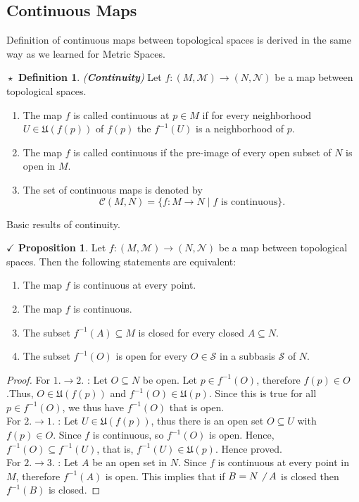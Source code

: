 \documentclass{article}
\theoremstyle{definition}
\newtheorem{definition}{$\boxed{\star}$ Definition}
\newcommand{\tit}[1]{\textit{#1}}
\theoremstyle{remark}
\theoremstyle{definition}
\theoremstyle{definition}
\newtheorem{proposition}{$\checkmark$ Proposition}
\newcommand{\topo}[1]{\mathcal{#1}}
\newcommand{\nbdsys}[2]{\mathfrak{#1}(#2)}
\newcommand{\cntnsmap}[2]{\mathscr{C}(#1,#2)}
\begin{document}
\subsection{Continuous Maps}
Definition of continuous maps between topological spaces is derived in the same way as we learned for Metric Spaces.
\hrulefill
\begin{definition}
	\tit{(\textbf{Continuity})} Let $ f : (M,\topo{M}) \longrightarrow (N,\topo{N}) $ be a map between topological spaces.
	\begin{enumerate}
		\item{The map $ f $ is called continuous at $ p\in M $ if for every neighborhood $ U\in \nbdsys{U}{f(p)} $ of $ f(p) $ the $ f^{-1}(U) $ is a neighborhood of $ p $.}
		\item{The map $ f $ is called continuous if the pre-image of every open subset of $ N $ is open in $ M $.}
		\item{The set of continuous maps is denoted by
	\[\cntnsmap{M}{N} = \{f : M \longrightarrow N \;\vert\;f \text{ is continuous}\}.\]	
	}
	\end{enumerate}
\end{definition}
\hrulefill
Basic results of continuity.
\hrulefill
\begin{proposition}
	Let $ f : (M,\topo{M}) \longrightarrow (N,\topo{N}) $ be a map between topological spaces. Then the following statements are equivalent:
	\begin{enumerate}
		\item{The map $ f $ is continuous at every point.}
		\item{The map $ f $ is continuous.}
		\item{The subset $ f^{-1}(A) \subseteq M $ is closed for every closed $ A\subseteq N $.}
		\item{The subset $ f^{-1}(O) $ is open for every $ O \in \topo{S} $ in a subbasis $ \topo{S} $ of $ N $.}
	\end{enumerate}
\end{proposition}
\begin{proof}
	For $ 1.\to 2. $ : Let $ O \subseteq N $ be open. Let $ p \in f^{-1}(O) $, therefore $ f(p)\in O $.Thus, $ O \in \nbdsys{U}{f(p)} $ and $ f^{-1}(O)\in \nbdsys{U}{p} $. Since this is true for all $ p\in f^{-1}(O) $, we thus have $ f^{-1}(O) $ that is open.\\
	For $ 2.\to 1. $ : Let $ U\in \nbdsys{U}{f(p)} $, thus there is an open set $ O \subseteq U $ with $ f(p)\in O $. Since $ f $ is continuous, so $ f^{-1}(O) $ is open. Hence, $ f^{-1}(O)\subseteq f^{-1}(U)  $, that is, $ f^{-1}(U) \in \nbdsys{U}{p}$. Hence proved. \\
 	For $ 2. \to 3. $ : Let $ A $ be an open set in $ N $. Since $ f $ is continuous at every point in $ M $, therefore $ f^{-1}(A) $ is open. This implies that if $ B = N\not\;\;A $ is closed then $ f^{-1}(B) $ is closed.
\end{proof}
\end{document}
